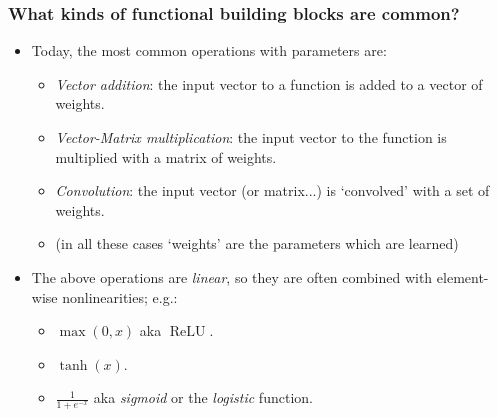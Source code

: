 \documentclass[\beamerclass]{beamer}
\DeclareMathOperator{\ReLU}{ReLU}
\begin{document}




\begin{frame}
\frametitle{What kinds of functional building blocks are common?}

\begin{itemize}
	\item<+-> Today, the most common operations with parameters are:
		\begin{itemize}
			\item \emph{Vector addition}: the input vector to a function is added to a vector of weights.
			\item \emph{Vector-Matrix multiplication}: the input vector to the function is multiplied with a matrix of weights.
			\item \emph{Convolution}: the input vector (or matrix...) is `convolved' with a set of weights.
			\item (in all these cases `weights' are the parameters which are learned)
		\end{itemize}
	\item<+-> The above operations are \emph{linear}, so they are often combined with element-wise nonlinearities; e.g.:
	\begin{itemize}
		\item $\max(0, x)$ aka $\ReLU$.
		\item $\tanh(x)$.
		\item $\frac{1}{1+e^{-x}}$ aka \emph{sigmoid} or the \emph{logistic} function. 
	\end{itemize}
\end{itemize}
\end{frame}
\end{document}
